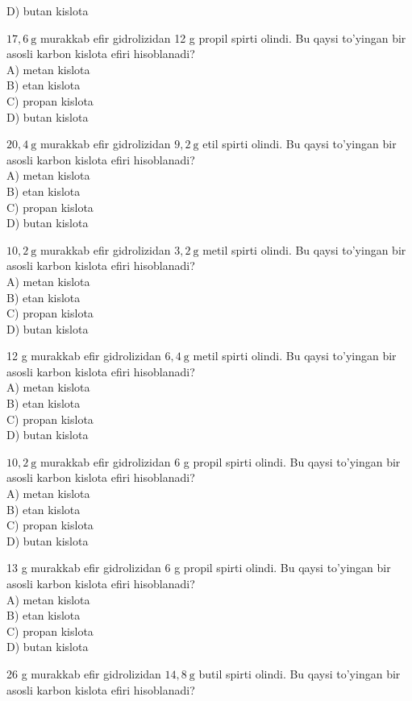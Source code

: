 D) butan kislota
  \item $17,6 \mathrm{~g}$ murakkab efir gidrolizidan 12 g propil spirti olindi. Bu qaysi to'yingan bir asosli karbon kislota efiri hisoblanadi?\\
A) metan kislota\\
B) etan kislota\\
C) propan kislota\\
D) butan kislota
  \item $20,4 \mathrm{~g}$ murakkab efir gidrolizidan $9,2 \mathrm{~g}$ etil spirti olindi. Bu qaysi to'yingan bir asosli karbon kislota efiri hisoblanadi?\\
A) metan kislota\\
B) etan kislota\\
C) propan kislota\\
D) butan kislota
  \item $10,2 \mathrm{~g}$ murakkab efir gidrolizidan $3,2 \mathrm{~g}$ metil spirti olindi. Bu qaysi to'yingan bir asosli karbon kislota efiri hisoblanadi?\\
A) metan kislota\\
B) etan kislota\\
C) propan kislota\\
D) butan kislota
  \item 12 g murakkab efir gidrolizidan $6,4 \mathrm{~g}$ metil spirti olindi. Bu qaysi to'yingan bir asosli karbon kislota efiri hisoblanadi?\\
A) metan kislota\\
B) etan kislota\\
C) propan kislota\\
D) butan kislota
  \item $10,2 \mathrm{~g}$ murakkab efir gidrolizidan 6 g propil spirti olindi. Bu qaysi to'yingan bir asosli karbon kislota efiri hisoblanadi?\\
A) metan kislota\\
B) etan kislota\\
C) propan kislota\\
D) butan kislota
  \item 13 g murakkab efir gidrolizidan 6 g propil spirti olindi. Bu qaysi to'yingan bir asosli karbon kislota efiri hisoblanadi?\\
A) metan kislota\\
B) etan kislota\\
C) propan kislota\\
D) butan kislota
  \item 26 g murakkab efir gidrolizidan $14,8 \mathrm{~g}$ butil spirti olindi. Bu qaysi to'yingan bir asosli karbon kislota efiri hisoblanadi?\\
